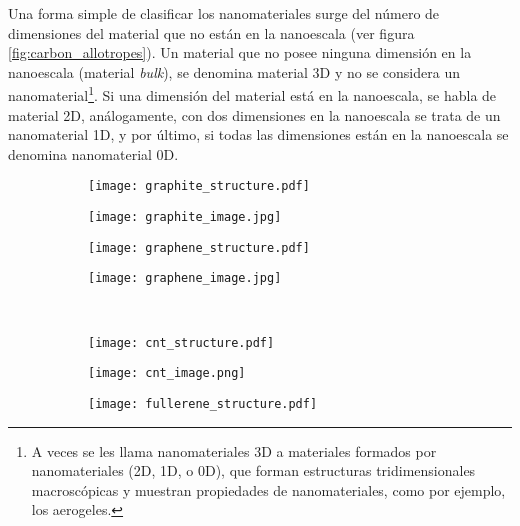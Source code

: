 Una forma simple de clasificar los nanomateriales surge del número de dimensiones del material que no están en la nanoescala (ver figura \ref{fig:carbon_allotropes}). Un material que no posee ninguna dimensión en la nanoescala (material \emph{bulk}), se denomina material 3D y no  se considera un nanomaterial\footnote{A veces se les llama nanomateriales 3D a materiales formados por nanomateriales (2D, 1D, o 0D), que forman estructuras tridimensionales macroscópicas y muestran propiedades de nanomateriales, como por ejemplo, los aerogeles.}. Si una dimensión del material está en la nanoescala, se habla de material 2D, análogamente, con dos dimensiones en la nanoescala se trata de un nanomaterial 1D, y por último, si todas las dimensiones están en la nanoescala se denomina nanomaterial 0D.

\begin{figure}
	\centering
	\begin{subfigure}[b]{0.2\textwidth}
		\texttt{[image: graphite\_structure.pdf]}
		\caption{}
		\label{fig:graphite_struct}
	\end{subfigure}
	\begin{subfigure}[b]{0.2\textwidth}
		\texttt{[image: graphite\_image.jpg]}
		\caption{}
		\label{fig:graphite_image}
	\end{subfigure}
	\begin{subfigure}[b]{0.2\textwidth}
		\texttt{[image: graphene\_structure.pdf]}
		\caption{}
		\label{fig:graphene_struct}
	\end{subfigure}
	\begin{subfigure}[b]{0.2\textwidth}
		\texttt{[image: graphene\_image.jpg]}
		\caption{}
		\label{fig:graphene_image}
	\end{subfigure}
\\
	\begin{subfigure}[b]{0.2\textwidth}
		\texttt{[image: cnt\_structure.pdf]}
		\caption{}
		\label{fig:cnt_struct}
	\end{subfigure}
	\begin{subfigure}[b]{0.2\textwidth}
		\texttt{[image: cnt\_image.png]}
		\caption{}
		\label{fig:cnt_image}
	\end{subfigure}
	\begin{subfigure}[b]{0.2\textwidth}
		\texttt{[image: fullerene\_structure.pdf]}
		\caption{}
		\label{fig:fullerene_structure}
	\end{subfigure}
	\begin{subfigure}[b]{0.2\textwidth}

\end{subfigure}
\end{figure}
